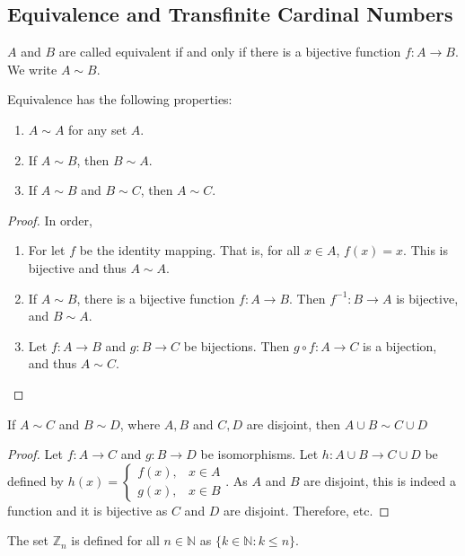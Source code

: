 \documentclass[crop=false,class=book]{standalone}
\begin{document}
\subsection{Equivalence and Transfinite Cardinal Numbers}
\begin{definition}
$A$ and $B$ are called equivalent if and only if there is a bijective function $f:A\rightarrow B$. We write $A\sim B$.
\end{definition}
\begin{theorem}
Equivalence has the following properties:
\begin{enumerate}
\item $A\sim A$ for any set $A$.
\item If $A\sim B$, then $B\sim A$.
\item If $A\sim B$ and $B\sim C$, then $A\sim C$.
\end{enumerate}
\end{theorem}
\begin{proof}
In order,
\begin{enumerate}
\item For let $f$ be the identity mapping. That is, for all $x\in A$, $f(x) = x$. This is bijective and thus $A\sim A$.
\item If $A\sim B$, there is a bijective function $f:A\rightarrow B$. Then $f^{-1}:B\rightarrow A$ is bijective, and $B\sim A$.
\item Let $f:A\rightarrow B$ and $g:B\rightarrow C$ be bijections. Then $g\circ f:A\rightarrow C$ is a bijection, and thus $A\sim C$.
\end{enumerate}
\end{proof}
\begin{theorem}
If $A\sim C$ and $B\sim D$, where $A,B$ and $C,D$ are disjoint, then $A\cup B \sim C\cup D$
\end{theorem}
\begin{proof}
Let $f:A\rightarrow C$ and $g:B\rightarrow D$ be isomorphisms. Let $h:A\cup B \rightarrow C\cup D$ be defined by $h(x) = \begin{cases} f(x), & x\in A\\ g(x), & x\in B\end{cases}$. As $A$ and $B$ are disjoint, this is indeed a function and it is bijective as $C$ and $D$ are disjoint. Therefore, etc.
\end{proof}
\begin{definition}
The set $\mathbb{Z}_n$ is defined for all $n\in \mathbb{N}$ as $\{k\in \mathbb{N}: k\leq n\}$.
\end{definition}
\end{document}
